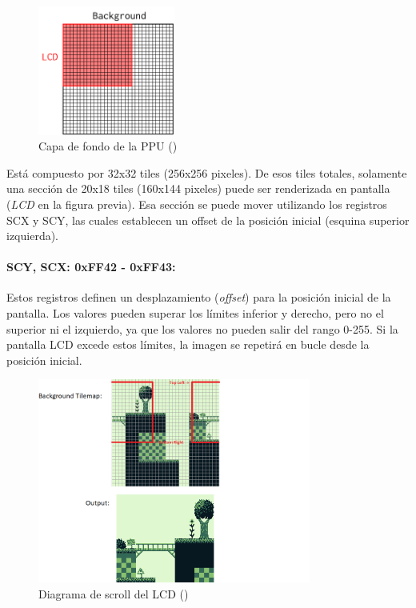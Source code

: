 \begin{figure}[H]
    \centering
    \includegraphics[width=0.4\textwidth]{include/images/grid_bg.png}
    \caption{Capa de fondo de la PPU (\cite{gbedg})}
    \label{figure:bg_layer}
\end{figure}

Está compuesto por 32x32 tiles (256x256 pixeles). De esos tiles totales, solamente una sección de 20x18 tiles (160x144 pixeles) puede ser renderizada en pantalla (\textit{LCD} en la figura previa). Esa sección se puede mover utilizando los registros SCX y SCY, las cuales establecen un offset de la posición inicial (esquina superior izquierda).

\paragraph{SCY, SCX: 0xFF42 - 0xFF43:} Estos registros definen un desplazamiento (\textit{offset}) para la posición inicial de la pantalla. Los valores pueden superar los límites inferior y derecho, pero no el superior ni el izquierdo, ya que los valores no pueden salir del rango 0-255. Si la pantalla LCD excede estos límites, la imagen se repetirá en bucle desde la posición inicial.

\begin{figure}[H]
    \centering
    \includegraphics[width=0.8\textwidth]{include/images/scrolling_diagram.png}
    \caption{Diagrama de scroll del LCD (\cite{newpandocs})}
    \label{figure:bg_scroll}
\end{figure}

